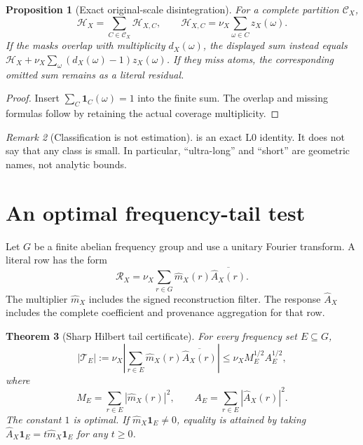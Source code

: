 \documentclass[11pt]{article}
\newtheorem{theorem}{Theorem}[section]
\newtheorem{proposition}[theorem]{Proposition}
\theoremstyle{definition}
\theoremstyle{remark}
\newtheorem{remark}[theorem]{Remark}
\newcommand{\one}{\mathbf 1}
\newcommand{\Lzero}{\mathrm{L0}}
\newcommand{\Tail}{\mathcal T}
\begin{document}
\begin{proposition}[Exact original-scale disintegration]
\label{prop:disintegration}
For a complete partition \(\mathcal C_X\),
\[
 \boxed{\quad
 \mathcal H_X=\sum_{C\in\mathcal C_X}\mathcal H_{X,C},
 \qquad
 \mathcal H_{X,C}
 =\nu_X\sum_{\omega\in C}z_X(\omega).
 \quad}
\]
If the masks overlap with multiplicity \(d_X(\omega)\), the displayed
sum instead equals
\(\mathcal H_X+\nu_X\sum_\omega(d_X(\omega)-1)z_X(\omega)\).
If they miss atoms, the corresponding omitted sum remains as a
literal residual.
\end{proposition}

\begin{proof}
Insert \(\sum_C\one_C(\omega)=1\) into the finite sum.  The overlap
and missing formulas follow by retaining the actual coverage
multiplicity.
\end{proof}

\begin{remark}[Classification is not estimation]
 is an exact \(\Lzero\) identity.  It does
not say that any class is small.  In particular, ``ultra-long'' and
``short'' are geometric names, not analytic bounds.
\end{remark}

\section{An optimal frequency-tail test}

Let \(G\) be a finite abelian frequency group and use a unitary
Fourier transform.  A literal row has the form
\[
 \mathcal R_X
 =\nu_X\sum_{r\in G}\widehat m_X(r)
       \overline{\widehat A_X(r)}.
\]
The multiplier \(\widehat m_X\) includes the signed reconstruction
filter.  The response \(\widehat A_X\) includes the complete
coefficient and provenance aggregation for that row.

\begin{theorem}[Sharp Hilbert tail certificate]
\label{thm:hilbert}
For every frequency set \(E\subseteq G\),
\[
 \left|\Tail_E\right|
 :=
 \nu_X\left|
 \sum_{r\in E}\widehat m_X(r)
       \overline{\widehat A_X(r)}
 \right|
 \le
 \nu_X M_E^{1/2}A_E^{1/2},
\]
where
\[
 M_E=\sum_{r\in E}|\widehat m_X(r)|^2,
 \qquad
 A_E=\sum_{r\in E}|\widehat A_X(r)|^2.
\]
The constant \(1\) is optimal.  If
\(\widehat m_X\one_E\ne0\), equality is attained by taking
\(\widehat A_X\one_E=t\widehat m_X\one_E\) for any \(t\ge0\).
\end{theorem}
\end{document}
